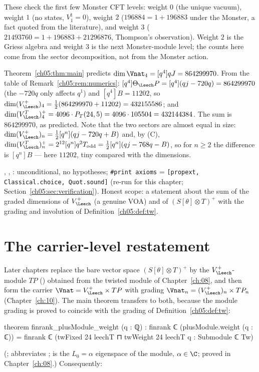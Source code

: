 \begin{physics}
These check the first few Monster CFT levels: weight $0$ (the unique vacuum), weight $1$ (no states, $V^\natural_1=0$), weight $2$ ($196884=1+196883$ under the Monster, a fact quoted from the literature), and weight $3$ ($21493760=1+196883+21296876$, Thompson's observation). Weight $2$ is the Griess algebra and weight $3$ is the next Monster-module level; the counts here come from the sector decomposition, not from the Monster action.
\end{physics}

\begin{example}[Weight $4$]
Theorem~\ref{ch05:thm:main} predicts $\dim\Vnat_4 = [q^4]qJ = 864299970$. From the table of
Remark~\ref{ch05:rem:numerics}: $[q^4]\Theta_\Leech P = [q^4](qj - 720q) = 864299970$ (the $-720q$ only
affects $q^1$) and $[q^4]B = 11202$, so $\dim(V_\Leech^+)_4 = \tfrac12(864299970 + 11202) = 432155586$;
and $\dim(V_\Leech^T)^+_4 = 4096\cdot P_T(24,5) = 4096\cdot105504 = 432144384$. The sum is $864299970$,
as predicted. Note that the two sectors are almost equal in size: $\dim(V_\Leech^+)_n = \tfrac12[q^n](qj - 720q + B)$
and, by (C), $\dim(V_\Leech^T)^+_n = 2^{12}[q^n]q^2T_{\mathrm{odd}} = \tfrac12[q^n](qj - 768q - B)$, so for $n\ge2$ the
difference is $[q^n]B$ --- here $11202$, tiny compared with the dimensions.
\end{example}

\begin{status}
, , :
unconditional, no hypotheses; \texttt{\#print axioms} = \texttt{[propext, Classical.choice, Quot.sound]}
(re-run for this chapter; Section~\ref{ch05:sec:verification}). Honest scope: a statement about the
sum of the graded dimensions of $V_\Leech^+$ (a genuine VOA) and of $(S[\theta]\otimes T)^+$ with the grading
and involution of Definition~\ref{ch05:def:tw}.
\end{status}

\section{The carrier-level restatement}\label{ch05:sec:carrier}

Later chapters replace the bare vector space $(S[\theta]\otimes T)^+$ by the $V_\Leech^+$-module $TP$
() obtained from the twisted module of Chapter~\ref{ch:08}, and then form
the carrier $\Vnat = V_\Leech^+\times TP$ with grading $\Vnat_n = (V_\Leech^+)_n\times TP_n$ (Chapter~\ref{ch:10}).
The main theorem transfers to both, because the module grading is proved to coincide with the
grading of Definition~\ref{ch05:def:tw}:
\begin{leancode}
theorem finrank_plusModule_weight (q : ℚ) :
    finrank ℂ (plusModule.weight (q : ℂ))
      = finrank ℂ (twFixed 24 leechT ⊓ twWeight 24 leechT q : Submodule ℂ Tw)
\end{leancode}
(;  abbreviates ;
 is the $L_0 = \alpha$ eigenspace of the module, $\alpha\in\C$; proved in
Chapter~\ref{ch:08}.) Consequently:

